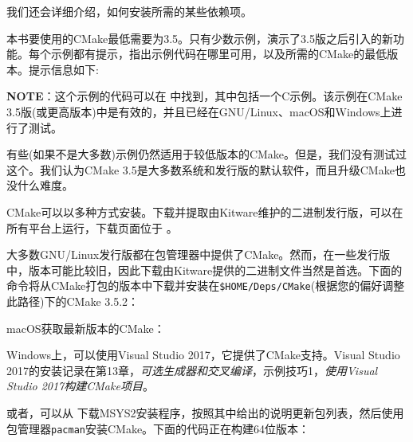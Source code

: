 我们还会详细介绍，如何安装所需的某些依赖项。


本书要使用的CMake最低需要为3.5。只有少数示例，演示了3.5版之后引入的新功能。每个示例都有提示，指出示例代码在哪里可用，以及所需的CMake的最低版本。提示信息如下:

\begin{myInfoBox}
\textbf{NOTE}：这个示例的代码可以在  中找到，其中包括一个C示例。该示例在CMake 3.5版(或更高版本)中是有效的，并且已经在GNU/Linux、macOS和Windows上进行了测试。
\end{myInfoBox}

有些(如果不是大多数)示例仍然适用于较低版本的CMake。但是，我们没有测试过这个。我们认为CMake 3.5是大多数系统和发行版的默认软件，而且升级CMake也没什么难度。

CMake可以以多种方式安装。下载并提取由Kitware维护的二进制发行版，可以在所有平台上运行，下载页面位于  。

大多数GNU/Linux发行版都在包管理器中提供了CMake。然而，在一些发行版中，版本可能比较旧，因此下载由Kitware提供的二进制文件当然是首选。下面的命令将从CMake打包的版本中下载并安装在\texttt{\$HOME/Deps/CMake}(根据您的偏好调整此路径)下的CMake 3.5.2：


macOS获取最新版本的CMake：


Windows上，可以使用Visual Studio 2017，它提供了CMake支持。Visual Studio 2017的安装记录在第13章，\emph{可选生成器和交叉编译}，示例技巧1，\emph{使用Visual Studio 2017构建CMake项目}。

或者，可以从  下载MSYS2安装程序，按照其中给出的说明更新包列表，然后使用包管理器\texttt{pacman}安装CMake。下面的代码正在构建64位版本：

